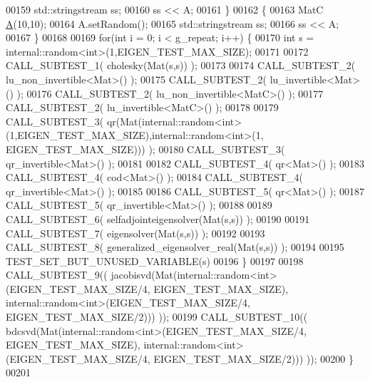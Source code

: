 \begin{DoxyCode}
00159     std::stringstream ss;
00160     ss << A;
00161   \}
00162   \{
00163     MatC \hyperlink{group___core___module_class_eigen_1_1_matrix}{A}(10,10);
00164     A.setRandom();
00165     std::stringstream ss;
00166     ss << A;
00167   \}
00168 
00169   \textcolor{keywordflow}{for}(\textcolor{keywordtype}{int} i = 0; i < g\_repeat; i++) \{
00170     \textcolor{keywordtype}{int} s = internal::random<int>(1,EIGEN\_TEST\_MAX\_SIZE);
00171 
00172     CALL\_SUBTEST\_1( cholesky(Mat(s,s)) );
00173 
00174     CALL\_SUBTEST\_2( lu\_non\_invertible<Mat>() );
00175     CALL\_SUBTEST\_2( lu\_invertible<Mat>() );
00176     CALL\_SUBTEST\_2( lu\_non\_invertible<MatC>() );
00177     CALL\_SUBTEST\_2( lu\_invertible<MatC>() );
00178 
00179     CALL\_SUBTEST\_3( qr(Mat(internal::random<int>(1,EIGEN\_TEST\_MAX\_SIZE),internal::random<int>(1,
      EIGEN\_TEST\_MAX\_SIZE))) );
00180     CALL\_SUBTEST\_3( qr\_invertible<Mat>() );
00181 
00182     CALL\_SUBTEST\_4( qr<Mat>() );
00183     CALL\_SUBTEST\_4( cod<Mat>() );
00184     CALL\_SUBTEST\_4( qr\_invertible<Mat>() );
00185 
00186     CALL\_SUBTEST\_5( qr<Mat>() );
00187     CALL\_SUBTEST\_5( qr\_invertible<Mat>() );
00188 
00189     CALL\_SUBTEST\_6( selfadjointeigensolver(Mat(s,s)) );
00190 
00191     CALL\_SUBTEST\_7( eigensolver(Mat(s,s)) );
00192 
00193     CALL\_SUBTEST\_8( generalized\_eigensolver\_real(Mat(s,s)) );
00194 
00195     TEST\_SET\_BUT\_UNUSED\_VARIABLE(s)
00196   \}
00197 
00198   CALL\_SUBTEST\_9(( jacobisvd(Mat(internal::random<int>(EIGEN\_TEST\_MAX\_SIZE/4, EIGEN\_TEST\_MAX\_SIZE), 
      internal::random<int>(EIGEN\_TEST\_MAX\_SIZE/4, EIGEN\_TEST\_MAX\_SIZE/2))) ));
00199   CALL\_SUBTEST\_10(( bdcsvd(Mat(internal::random<int>(EIGEN\_TEST\_MAX\_SIZE/4, EIGEN\_TEST\_MAX\_SIZE), 
      internal::random<int>(EIGEN\_TEST\_MAX\_SIZE/4, EIGEN\_TEST\_MAX\_SIZE/2))) ));
00200 \}
00201 
\end{DoxyCode}
